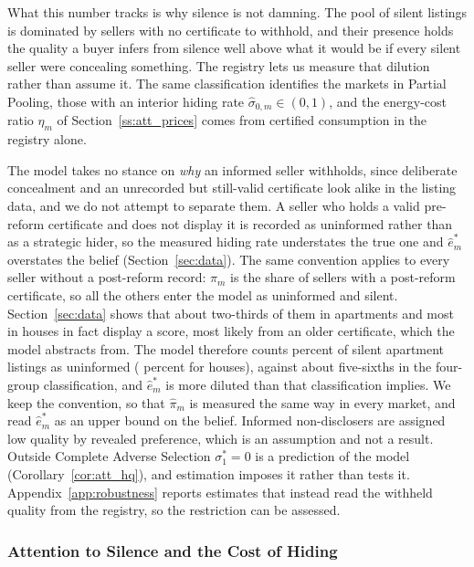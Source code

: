 What this number tracks is why silence is not damning. The pool of silent listings is dominated by sellers with no certificate to withhold, and their presence holds the quality a buyer infers from silence well above what it would be if every silent seller were concealing something. The registry lets us measure that dilution rather than assume it. The same classification identifies the markets in Partial Pooling, those with an interior hiding rate $\hat\sigma_{0,m}\in(0,1)$, and the energy-cost ratio $\eta_m$ of Section~\ref{ss:att_prices} comes from certified consumption in the registry alone.

The model takes no stance on \emph{why} an informed seller withholds, since deliberate concealment and an unrecorded but still-valid certificate look alike in the listing data, and we do not attempt to separate them. A seller who holds a valid pre-reform certificate and does not display it is recorded as uninformed rather than as a strategic hider, so the measured hiding rate understates the true one and $\hat e^*_m$ overstates the belief (Section~\ref{sec:data}). The same convention applies to every seller without a post-reform record: $\hat\pi_m$ is the share of sellers with a post-reform certificate, so all the others enter the model as uninformed and silent. Section~\ref{sec:data} shows that about two-thirds of them in apartments and most in houses in fact display a score, most likely from an older certificate, which the model abstracts from. The model therefore counts \attShareUninfApt{} percent of silent apartment listings as uninformed (\attShareUninfHouse{} percent for houses), against about five-sixths in the four-group classification, and $\hat e^*_m$ is more diluted than that classification implies. We keep the convention, so that $\hat\pi_m$ is measured the same way in every market, and read $\hat e^*_m$ as an upper bound on the belief. Informed non-disclosers are assigned low quality by revealed preference, which is an assumption and not a result. Outside Complete Adverse Selection $\sigma_1^*=0$ is a prediction of the model (Corollary~\ref{cor:att_hq}), and estimation imposes it rather than tests it. Appendix~\ref{app:robustness} reports estimates that instead read the withheld quality from the registry, so the restriction can be assessed.

\subsubsection{Attention to Silence and the Cost of Hiding}
\label{ss:att_identification}


